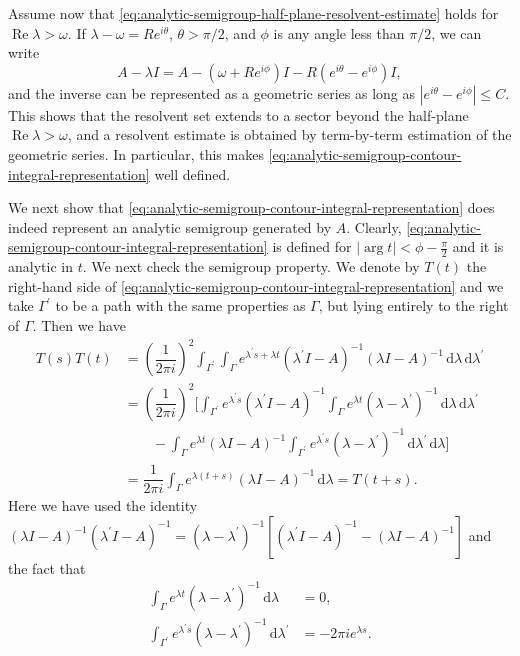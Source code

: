 Assume now that \eqref{eq:analytic-semigroup-half-plane-resolvent-estimate} holds for $\operatorname{Re}\lambda>\omega$. If $\lambda-\omega=Re^{i\theta}$, $\theta>\pi/2$, and $\phi$ is any angle less than $\pi/2$, we can write
\begin{equation}\label{eq:analytic-generator-sector-resolvent-extension-splitting}
A-\lambda I=A-(\omega+Re^{i\phi})I-R(e^{i\theta}-e^{i\phi})I,
\end{equation}
and the inverse can be represented as a geometric series as long as $|e^{i\theta}-e^{i\phi}|\leq C$. This shows that the resolvent set extends to a sector beyond the half-plane $\operatorname{Re}\lambda>\omega$, and a resolvent estimate is obtained by term-by-term estimation of the geometric series. In particular, this makes \eqref{eq:analytic-semigroup-contour-integral-representation} well defined.

We next show that \eqref{eq:analytic-semigroup-contour-integral-representation} does indeed represent an analytic semigroup generated by $A$. Clearly, \eqref{eq:analytic-semigroup-contour-integral-representation} is defined for $|\arg t|<\phi-\frac{\pi}{2}$ and it is analytic in $t$. We next check the semigroup property. We denote by $T(t)$ the right-hand side of \eqref{eq:analytic-semigroup-contour-integral-representation} and we take $\Gamma^{\prime}$ to be a path with the same properties as $\Gamma$, but lying entirely to the right of $\Gamma$. Then we have\[\begin{aligned}
T(s)T(t)&=\left(\dfrac{1}{2\pi i}\right)^2\int_{\Gamma^{\prime}}\int_\Gamma e^{\lambda^{\prime}s+\lambda t}(\lambda^{\prime}I-A)^{-1}(\lambda I-A)^{-1}\,\mathrm{d}\lambda\,\mathrm{d}\lambda^{\prime}\\
&=\left(\dfrac{1}{2\pi i}\right)^2\Bigg[\int_{\Gamma^{\prime}}e^{\lambda^{\prime}s}(\lambda^{\prime}I-A)^{-1}\int_\Gamma e^{\lambda t}(\lambda-\lambda^{\prime})^{-1}\,\mathrm{d}\lambda\,\mathrm{d}\lambda^{\prime}\\
&\qquad-\int_\Gamma e^{\lambda t}(\lambda I-A)^{-1}\int_{\Gamma^{\prime}}e^{\lambda^{\prime}s}(\lambda-\lambda^{\prime})^{-1}\,\mathrm{d}\lambda^{\prime}\,\mathrm{d}\lambda\Bigg]\\
&=\dfrac{1}{2\pi i}\int_\Gamma e^{\lambda(t+s)}(\lambda I-A)^{-1}\,\mathrm{d}\lambda=T(t+s).
\end{aligned}\]Here we have used the identity $(\lambda I-A)^{-1}(\lambda^{\prime}I-A)^{-1}=(\lambda-\lambda^{\prime})^{-1}[(\lambda^{\prime}I-A)^{-1}-(\lambda I-A)^{-1}]$ and the fact that\[\begin{aligned}
\int_\Gamma e^{\lambda t}(\lambda-\lambda^{\prime})^{-1}\,\mathrm{d}\lambda&=0,\\
\int_{\Gamma^{\prime}}e^{\lambda^{\prime}s}(\lambda-\lambda^{\prime})^{-1}\,\mathrm{d}\lambda^{\prime}&=-2\pi i e^{\lambda s}.
\end{aligned}\]


